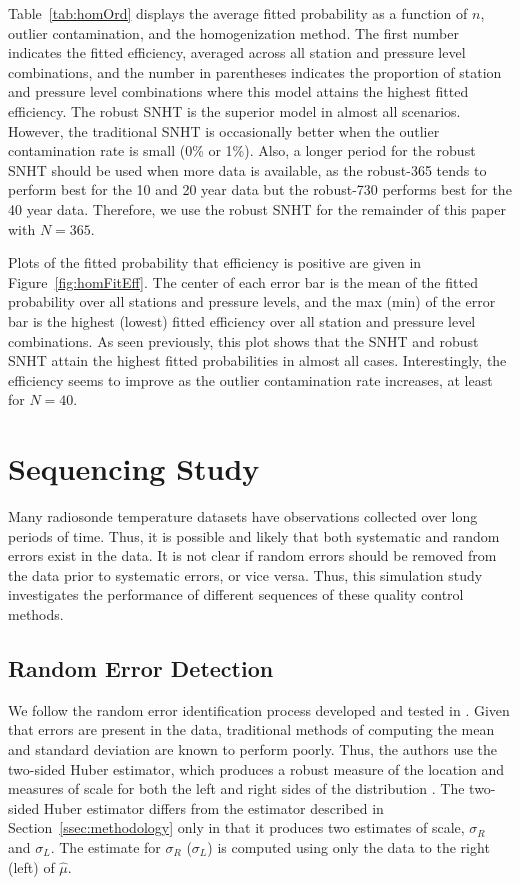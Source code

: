 \documentclass[12pt]{article}
\begin{document}
\begin{doublespacing}
Table~\ref{tab:homOrd} displays the average fitted probability as a function of $n$, outlier contamination, and the homogenization method.  The first number indicates the fitted efficiency, averaged across all station and pressure level combinations, and the number in parentheses indicates the proportion of station and pressure level combinations where this model attains the highest fitted efficiency.  The robust SNHT is the superior model in almost all scenarios.  However, the traditional SNHT is occasionally better when the outlier contamination rate is small (0\% or 1\%).  Also, a longer period for the robust SNHT should be used when more data is available, as the robust-365 tends to perform best for the 10 and 20 year data but the robust-730 performs best for the 40 year data.  Therefore, we use the robust SNHT for the remainder of this paper with $N=365$.

Plots of the fitted probability that efficiency is positive are given in Figure~\ref{fig:homFitEff}.  The center of each error bar is the mean of the fitted probability over all stations and pressure levels, and the max (min) of the error bar is the highest (lowest) fitted efficiency over all station and pressure level combinations.  As seen previously, this plot shows that the SNHT and robust SNHT attain the highest fitted probabilities in almost all cases.  Interestingly, the efficiency seems to improve as the outlier contamination rate increases, at least for $N=40$.

\section{Sequencing Study}

Many radiosonde temperature datasets have observations collected over long periods of time.  Thus, it is possible and likely that both systematic and random errors exist in the data.  It is not clear if random errors should be removed from the data prior to systematic errors, or vice versa.  Thus, this simulation study investigates the performance of different sequences of these quality control methods.

\subsection{Random Error Detection}
\label{sec:ranErr}
We follow the random error identification process developed and tested in \cite{bell14}.  Given that errors are present in the data, traditional methods of computing the mean and standard deviation are known to perform poorly.  Thus, the authors use the two-sided Huber estimator, which produces a robust measure of the location and measures of scale for both the left and right sides of the distribution \cite{huber11}.  The two-sided Huber estimator differs from the estimator described in Section~\ref{ssec:methodology} only in that it produces two estimates of scale, $\sigma_R$ and $\sigma_L$.  The estimate for $\sigma_R$ ($\sigma_L$) is computed using only the data to the right (left) of $\hat{\mu}$.


\end{doublespacing}
\end{document}

